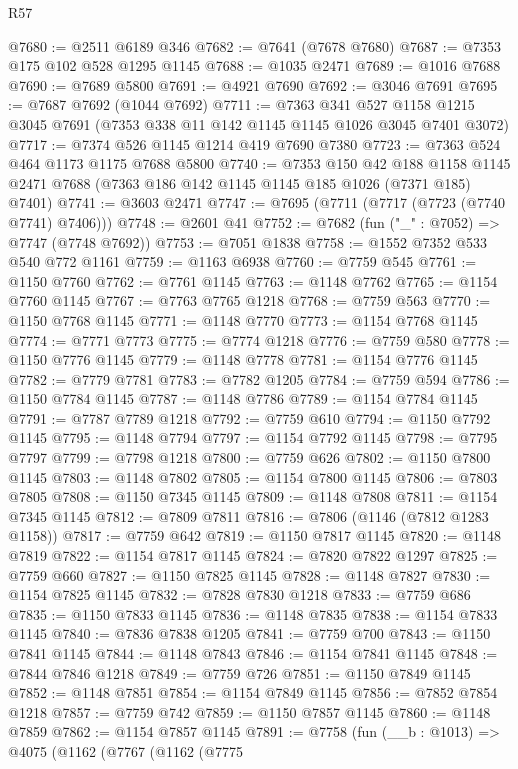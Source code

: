\begin{lexlean}{R57}
\begin{coremodule}
@7680 := @2511 @6189 @346
@7682 := @7641 (@7678 @7680)
@7687 := @7353 @175 @102 @528 @1295 @1145
@7688 := @1035 @2471
@7689 := @1016 @7688
@7690 := @7689 @5800
@7691 := @4921 @7690
@7692 := @3046 @7691
@7695 := @7687 @7692 (@1044 @7692)
@7711 := @7363
    @341
    @527
    @1158
    @1215
    @3045
    @7691
    (@7353 @338 @11 @142 @1145 @1145 @1026 @3045 @7401 @3072)
@7717 := @7374 @526 @1145 @1214 @419 @7690 @7380
@7723 := @7363 @524 @464 @1173 @1175 @7688 @5800
@7740 := @7353
    @150
    @42
    @188
    @1158
    @1145
    @2471
    @7688
    (@7363 @186 @142 @1145 @1145 @185 @1026 (@7371 @185) @7401)
@7741 := @3603 @2471
@7747 := @7695 (@7711 (@7717 (@7723 (@7740 @7741) @7406)))
@7748 := @2601 @41
@7752 := @7682 (fun ("_" : @7052) => @7747 (@7748 @7692))
@7753 := @7051 @1838
@7758 := @1552 @7352 @533 @540 @772 @1161
@7759 := @1163 @6938
@7760 := @7759 @545
@7761 := @1150 @7760
@7762 := @7761 @1145
@7763 := @1148 @7762
@7765 := @1154 @7760 @1145
@7767 := @7763 @7765 @1218
@7768 := @7759 @563
@7770 := @1150 @7768 @1145
@7771 := @1148 @7770
@7773 := @1154 @7768 @1145
@7774 := @7771 @7773
@7775 := @7774 @1218
@7776 := @7759 @580
@7778 := @1150 @7776 @1145
@7779 := @1148 @7778
@7781 := @1154 @7776 @1145
@7782 := @7779 @7781
@7783 := @7782 @1205
@7784 := @7759 @594
@7786 := @1150 @7784 @1145
@7787 := @1148 @7786
@7789 := @1154 @7784 @1145
@7791 := @7787 @7789 @1218
@7792 := @7759 @610
@7794 := @1150 @7792 @1145
@7795 := @1148 @7794
@7797 := @1154 @7792 @1145
@7798 := @7795 @7797
@7799 := @7798 @1218
@7800 := @7759 @626
@7802 := @1150 @7800 @1145
@7803 := @1148 @7802
@7805 := @1154 @7800 @1145
@7806 := @7803 @7805
@7808 := @1150 @7345 @1145
@7809 := @1148 @7808
@7811 := @1154 @7345 @1145
@7812 := @7809 @7811
@7816 := @7806 (@1146 (@7812 @1283 @1158))
@7817 := @7759 @642
@7819 := @1150 @7817 @1145
@7820 := @1148 @7819
@7822 := @1154 @7817 @1145
@7824 := @7820 @7822 @1297
@7825 := @7759 @660
@7827 := @1150 @7825 @1145
@7828 := @1148 @7827
@7830 := @1154 @7825 @1145
@7832 := @7828 @7830 @1218
@7833 := @7759 @686
@7835 := @1150 @7833 @1145
@7836 := @1148 @7835
@7838 := @1154 @7833 @1145
@7840 := @7836 @7838 @1205
@7841 := @7759 @700
@7843 := @1150 @7841 @1145
@7844 := @1148 @7843
@7846 := @1154 @7841 @1145
@7848 := @7844 @7846 @1218
@7849 := @7759 @726
@7851 := @1150 @7849 @1145
@7852 := @1148 @7851
@7854 := @1154 @7849 @1145
@7856 := @7852 @7854 @1218
@7857 := @7759 @742
@7859 := @1150 @7857 @1145
@7860 := @1148 @7859
@7862 := @1154 @7857 @1145
@7891 := @7758
    (fun (__b : @1013) =>
    @4075
      (@1162
        (@7767
          (@1162
            (@7775

\end{coremodule}
\end{lexlean}
